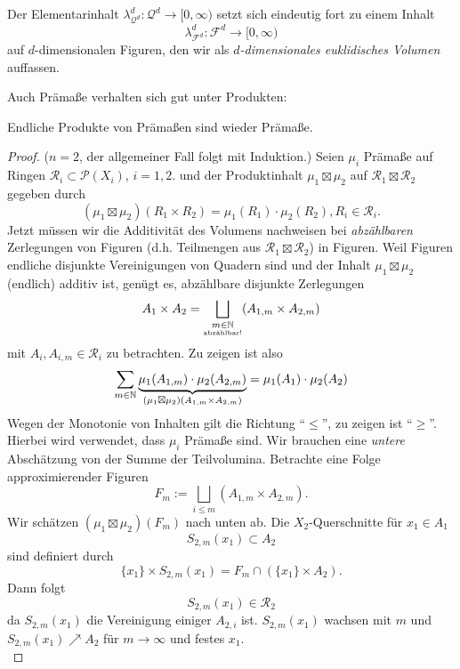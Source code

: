 \begin{hauptbsp}
Der Elementarinhalt $\lambda^d_{\mathcal{Q}^d}: \mathcal{Q}^d \longrightarrow [0,\infty)$ setzt sich eindeutig fort zu einem Inhalt
$$
\lambda^d_{\mathcal{F}^d}: \mathcal{F}^d \longrightarrow [0,\infty)
$$
auf $d$-dimensionalen Figuren, den wir als \emph{$d$-dimensionales euklidisches Volumen} auffassen.
\end{hauptbsp}

Auch Prämaße verhalten sich gut unter Produkten:

\begin{satz}
\begin{mdframed}
Endliche Produkte von Prämaßen sind wieder Prämaße.
\end{mdframed}
\begin{proof}
($n=2$, der allgemeiner Fall folgt mit Induktion.)   \newline
Seien $\mu_i$ Prämaße auf Ringen $\mathcal{R}_i \subset \mathcal{P}(X_i)$, $i=1,2$. und der Produktinhalt $\mu_1 \boxtimes \mu_2$ auf $\mathcal{R}_1 \boxtimes \mathcal{R}_2$ gegeben durch
$$(\mu_1 \boxtimes \mu_2) (R_1 \times R_2) = \mu_1 (R_1) \cdot \mu_2(R_2), R_i \in \mathcal{R}_i.$$ Jetzt müssen wir die Additivität des Volumens nachweisen bei \emph{abzählbaren} Zerlegungen von Figuren (d.h. Teilmengen aus $\mathcal{R}_1 \boxtimes \mathcal{R}_2$) in Figuren. Weil Figuren endliche disjunkte Vereinigungen von Quadern sind und der Inhalt $\mu_1 \boxtimes \mu_2$ (endlich) additiv ist, genügt es, abzählbare disjunkte Zerlegungen
$$
A_1 \times A_2 = \bigsqcup_{\substack{m\in \mathbb{N} \\ \text{\tiny abzählbar!}}} (A_{1,m} \times A_{2,m})
$$
mit $A_i, A_{i,m} \in \mathcal{R}_i$ zu betrachten. Zu zeigen ist also
$$
\sum_{m\in \mathbb{N}} \underbrace{\mu_1(A_{1,m}) \cdot \mu_2(A_{2,m})}_{(\mu_1 \boxtimes \mu_2) (A_{1,m}\times A_{2,m})} = \mu_1 (A_1) \cdot \mu_2(A_2)
$$
Wegen der Monotonie von Inhalten gilt die Richtung ``$\leq$'', zu zeigen ist ``$\geq$''.
Hierbei wird verwendet, dass $\mu_i$ Prämaße sind. Wir brauchen eine \emph{untere} Abschätzung von der Summe der Teilvolumina. Betrachte eine Folge approximierender Figuren
$$F_m := \bigsqcup_{i \leq m}(A_{1,m} \times A_{2,m}).$$
Wir schätzen $(\mu_1 \boxtimes \mu_2) (F_m)$ nach unten ab. Die $X_2$-Querschnitte für $x_1 \in A_1$ 
$$S_{2,m}(x_1) \subset A_2$$
sind definiert durch
$$\{x_1\} \times S_{2,m}(x_1) = F_m \cap ( \{x_1\} \times A_2).$$
Dann folgt
$$S_{2,m} (x_1) \in \mathcal{R}_2$$
da $S_{2,m}(x_1)$ die Vereinigung einiger $A_{2,i}$ ist. $S_{2,m}(x_1)$ wachsen mit $m$ und $S_{2,m}(x_1) \nearrow A_2$ für $m \to \infty$ und festes $x_1$. \\

\end{proof}
\end{satz}
